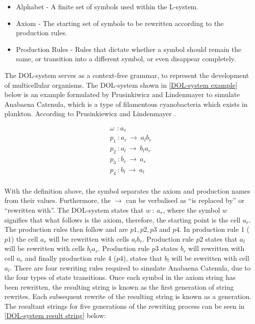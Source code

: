 \begin{itemize}[noitemsep]
	\item Alphabet - A finite set of symbols used within the L-system.
	\item Axiom - The starting set of symbols to be rewritten according to the production rules.
	\item Production Rules - Rules that dictate whether a symbol should remain the same, or transition into a different symbol, or even disappear completely.
\end{itemize}
\noindent
The DOL-system serves as a context-free grammar, to represent the development of multicellular organisms. The DOL-system shown in \ref{DOL-system example} below is an example formulated by Prusinkiwicz and Lindenmayer to simulate Anabaena Catenula, which is a type of filamentous cyanobacteria which exists in plankton. According to Prusinkiewicz and Lindenmayer  \cite{prusinkiewicz2012algorithmic}.

\begin{equation} \label{DOL-system example}
\begin{aligned}
	&\omega~~ : a_r \\
	&p_1~ :  a_r~ \rightarrow~ a_l b_r\\
	&p_2~ :  a_l~ \rightarrow~ b_l a_r\\
	&p_3~ :  b_r~ \rightarrow~ a_r\\
	&p_4~ :  b_l~ \rightarrow~ a_l\\
\end{aligned}
\end{equation}

\noindent
With the definition above, the \say{:} symbol separates the axiom and production names from their values. Furthermore, the $\rightarrow$ can be verbalised as ``is replaced by'' or ``rewritten with''. The DOL-system states that $w~ :~ a_r$, where the symbol $w$ signifies that what follows is the axiom, therefore, the starting point is the cell $a_r$. The production rules then follow and are $p1, p2, p3$ and $p4$. In production rule 1 ($p1$) the cell $a_r$ will be rewritten with cells $a_l b_r$. Production rule $p2$ states that $a_l$ will be rewritten with cells $b_l a_r$. Production rule $p3$ states $b_r$ will rewritten with cell $a_r$ and finally production rule 4 ($p4$), states that $b_l$ will be rewritten with cell $a_l$. There are four rewriting rules required to simulate Anabaena Catenula, due to the four types of state transitions. Once each symbol in the axiom string has been rewritten, the resulting string is known as the first generation of string rewrites. Each subsequent rewrite of the resulting string is known as a generation. The resultant strings for five generations of the rewriting process can be seen in \ref{DOL-system result string} below:


